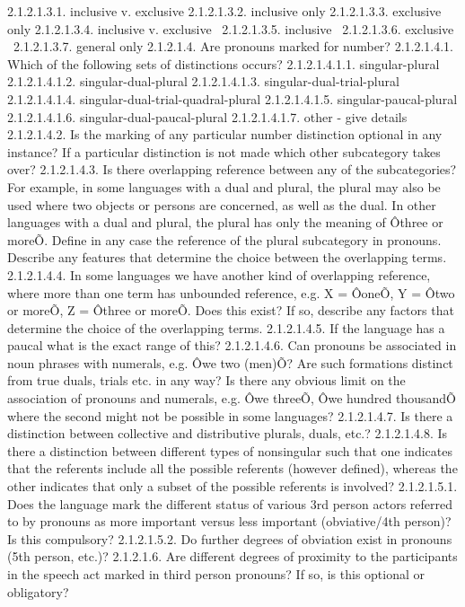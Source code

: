 2.1.2.1.3.1. inclusive v. exclusive
2.1.2.1.3.2. inclusive only
2.1.2.1.3.3. exclusive only
2.1.2.1.3.4. inclusive v. exclusive \
2.1.2.1.3.5. inclusive \
2.1.2.1.3.6. exclusive \
2.1.2.1.3.7. general only
2.1.2.1.4. Are pronouns marked for number?
2.1.2.1.4.1. Which of the following sets of distinctions occurs?
2.1.2.1.4.1.1. singular-plural
2.1.2.1.4.1.2. singular-dual-plural
2.1.2.1.4.1.3. singular-dual-trial-plural
2.1.2.1.4.1.4. singular-dual-trial-quadral-plural
2.1.2.1.4.1.5. singular-paucal-plural
2.1.2.1.4.1.6. singular-dual-paucal-plural
2.1.2.1.4.1.7. other - give details
2.1.2.1.4.2. Is the marking of any particular number distinction optional in any instance? If a particular distinction is not made which other subcategory takes over?
2.1.2.1.4.3. Is there overlapping reference between any of the subcategories? For example, in some languages with a dual and plural, the plural may also be used where two objects or persons are concerned, as well as the dual. In other languages with a dual and plural, the plural has only the meaning of Ôthree or moreÕ. Define in any case the reference of the plural subcategory in pronouns. Describe any features that determine the choice between the overlapping terms.
2.1.2.1.4.4. In some languages we have another kind of overlapping reference, where more than one term has unbounded reference, e.g. X = ÔoneÕ, Y = Ôtwo or moreÕ, Z = Ôthree or moreÕ. Does this exist? If so, describe any factors that determine the choice of the overlapping terms.
2.1.2.1.4.5. If the language has a paucal what is the exact range of this?
2.1.2.1.4.6. Can pronouns be associated in noun phrases with numerals, e.g. Ôwe two (men)Õ? Are such formations distinct from true duals, trials etc. in any way? Is there any obvious limit on the association of pronouns and numerals, e.g. Ôwe threeÕ, Ôwe hundred thousandÕ where the second might not be possible in some languages?
2.1.2.1.4.7. Is there a distinction between collective and distributive plurals, duals, etc.?
2.1.2.1.4.8. Is there a distinction between different types of nonsingular such that one indicates that the referents include all the possible referents (however defined), whereas the other indicates that only a subset of the possible referents is involved?
2.1.2.1.5.1. Does the language mark the different status of various 3rd person actors referred to by pronouns as more important versus less important (obviative/4th person)? Is this compulsory?
2.1.2.1.5.2. Do further degrees of obviation exist in pronouns (5th person, etc.)?
2.1.2.1.6. Are different degrees of proximity to the participants in the speech act marked in third person pronouns? If so, is this optional or obligatory?
